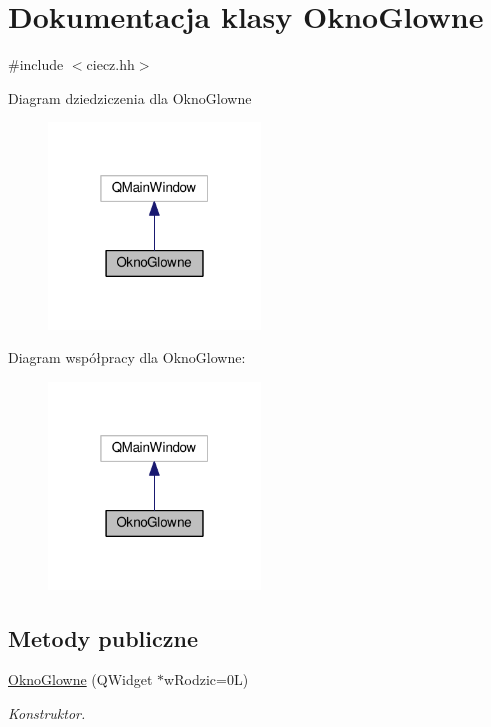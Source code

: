 \hypertarget{class_okno_glowne}{\section{Dokumentacja klasy Okno\-Glowne}
\label{class_okno_glowne}
}


{\ttfamily \#include $<$ciecz.\-hh$>$}



Diagram dziedziczenia dla Okno\-Glowne
\nopagebreak
\begin{figure}[H]
\begin{center}
\leavevmode
\includegraphics[width=160pt]{class_okno_glowne__inherit__graph}
\end{center}
\end{figure}


Diagram współpracy dla Okno\-Glowne\-:
\nopagebreak
\begin{figure}[H]
\begin{center}
\leavevmode
\includegraphics[width=160pt]{class_okno_glowne__coll__graph}
\end{center}
\end{figure}
\subsection*{Metody publiczne}
\begin{DoxyCompactItemize}
\item 
\hyperlink{class_okno_glowne_a5a6ee46921444828600e6ec825f31153}{Okno\-Glowne} (Q\-Widget $\ast$w\-Rodzic=0\-L)
\begin{DoxyCompactList}\small\item\em Konstruktor. \end{DoxyCompactList}\end{DoxyCompactItemize}



